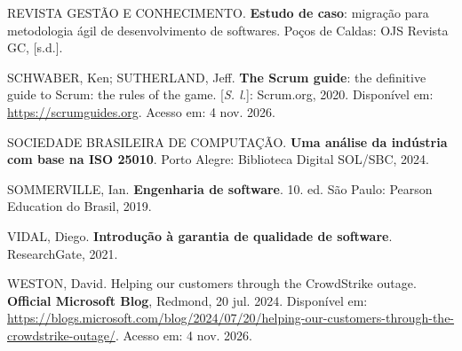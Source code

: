 \documentclass[12pt,a4paper]{article}
\begin{document}
\begin{singlespace}
REVISTA GESTÃO E CONHECIMENTO. \textbf{Estudo de caso}: migração para metodologia ágil de desenvolvimento de softwares. Poços de Caldas: OJS Revista GC, [s.d.].

SCHWABER, Ken; SUTHERLAND, Jeff. \textbf{The Scrum guide}: the definitive guide to Scrum: the rules of the game. [\textit{S. l.}]: Scrum.org, 2020. Disponível em: \url{https://scrumguides.org}. Acesso em: 4 nov. 2026.

SOCIEDADE BRASILEIRA DE COMPUTAÇÃO. \textbf{Uma análise da indústria com base na ISO 25010}. Porto Alegre: Biblioteca Digital SOL/SBC, 2024.

SOMMERVILLE, Ian. \textbf{Engenharia de software}. 10. ed. São Paulo: Pearson Education do Brasil, 2019.

VIDAL, Diego. \textbf{Introdução à garantia de qualidade de software}. ResearchGate, 2021.

WESTON, David. Helping our customers through the CrowdStrike outage. \textbf{Official Microsoft Blog}, Redmond, 20 jul. 2024. Disponível em: \url{https://blogs.microsoft.com/blog/2024/07/20/helping-our-customers-through-the-crowdstrike-outage/}. Acesso em: 4 nov. 2026.
\end{singlespace}
\end{document}
